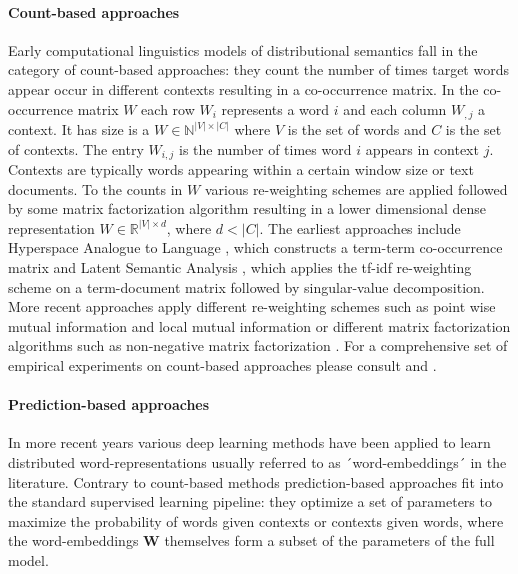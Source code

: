 \paragraph{Count-based approaches}
Early computational linguistics models of distributional semantics fall in the category of
count-based approaches: they count the number of times target words appear occur in different
contexts resulting in a co-occurrence matrix. In the co-occurrence matrix
$W$ each row $W_i$ represents a word $i$ and each column $W_{,j}$ a context. It has size
is a $W \in \mathbb{N}^{|V| \times |C|}$ where $V$ is the set of words and $C$ is
the set of contexts.
The entry $W_{i,j}$ is the number of times word $i$ appears in context $j$.
Contexts are typically words appearing within a certain window size or text documents.
To the counts in $W$ various re-weighting schemes are applied followed by some matrix factorization algorithm
resulting in a lower dimensional dense representation $W \in \mathbb{R}^{|V| \times d}$, where $d < |C|$.
The earliest approaches include Hyperspace Analogue to Language \citep{lund1996producing},
which constructs a term-term co-occurrence matrix and Latent Semantic Analysis \citep{dumais2004latent},
which applies the tf-idf re-weighting scheme on a term-document matrix followed by singular-value decomposition.
More recent approaches apply different re-weighting schemes such as point wise mutual information and local mutual
information \citep{evert2005statistics} or different matrix factorization algorithms such as non-negative
matrix factorization \citep{baroni2014don}. For a comprehensive set of empirical experiments on count-based
approaches please consult \cite{bullinaria2007extracting} and \cite{bullinaria2012extracting}.

\paragraph{Prediction-based approaches}
In more recent years
various deep learning methods have been applied to learn distributed word-representations usually referred to
as ´word-embeddings´ in the literature. Contrary to count-based methods prediction-based approaches fit into the
standard supervised learning pipeline: they optimize a set of parameters to maximize the probability of words
given contexts or contexts given words, where the word-embeddings $\mathbf{W}$
themselves form a subset of the parameters of the full model.

